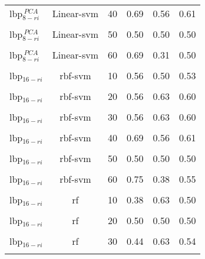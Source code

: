 \begin{table}
{\begin{tabular}{l c c  lcr}
 \acs{lbp}$_{8-ri}^{~PCA}$ & Linear-\acs{svm} & 40 & 0.69 & 0.56 & 0.61 \\
 \multicolumn{6}{c}{}\\[-1.5ex]

 \acs{lbp}$_{8-ri}^{~PCA}$ & Linear-\acs{svm} & 50 & 0.50 & 0.50 & 0.50 \\
 \multicolumn{6}{c}{}\\[-1.5ex]

 \acs{lbp}$_{8-ri}^{~PCA}$ & Linear-\acs{svm} & 60 & 0.69 & 0.31 & 0.50 \\
 \multicolumn{6}{c}{}\\[-1.5ex]

 \acs{lbp}$_{16-ri}$ & \acs{rbf}-\acs{svm} & 10 & 0.56 & 0.50 & 0.53 \\
 \multicolumn{6}{c}{}\\[-1.5ex]

 \acs{lbp}$_{16-ri}$ & \acs{rbf}-\acs{svm} & 20 & 0.56 & 0.63 & 0.60 \\
 \multicolumn{6}{c}{}\\[-1.5ex]
  
 \acs{lbp}$_{16-ri}$ & \acs{rbf}-\acs{svm} & 30 & 0.56 & 0.63 & 0.60 \\
 \multicolumn{6}{c}{}\\[-1.5ex]

 \acs{lbp}$_{16-ri}$ & \acs{rbf}-\acs{svm} & 40 & 0.69 & 0.56 & 0.61 \\
 \multicolumn{6}{c}{}\\[-1.5ex]

 \acs{lbp}$_{16-ri}$ & \acs{rbf}-\acs{svm} & 50 & 0.50 & 0.50 & 0.50 \\
 \multicolumn{6}{c}{}\\[-1.5ex]

 \acs{lbp}$_{16-ri}$ & \acs{rbf}-\acs{svm} & 60 & 0.75 & 0.38 & 0.55 \\
 \multicolumn{6}{c}{}\\[-1.5ex]

 \acs{lbp}$_{16-ri}$ & \acs{rf} & 10 & 0.38 & 0.63 & 0.50 \\
 \multicolumn{6}{c}{}\\[-1.5ex] 

 \acs{lbp}$_{16-ri}$ & \acs{rf} & 20 & 0.50 & 0.50 & 0.50 \\
 \multicolumn{6}{c}{}\\[-1.5ex] 

 \acs{lbp}$_{16-ri}$ & \acs{rf} & 30 & 0.44 & 0.63 & 0.54 \\
 \multicolumn{6}{c}{}\\[-1.5ex]


\end{tabular}}
\end{table}

